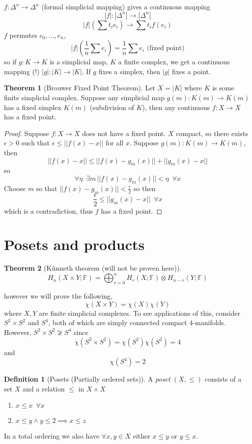 \documentclass[a4paper,14pt]{extarticle}
\theoremstyle{definition}
\newtheorem*{theorem}{Theorem}
\newtheorem*{definition}{Definition}
\begin{document}
$f:\Delta^n\rightarrow \Delta^n$ (formal simplicial mapping) gives a continuous mapping
\[|f|:|\Delta^n|\rightarrow |\Delta^n|\]
\[|f|(\sum t_i e_i)\rightarrow \sum t_i f(e_i)\] $f$ permutes $e_0, \ldots, e_n$,
\[|f|(\frac{1}{n}\sum e_i) = \frac{1}{n}\sum e_i\text{ (fixed point)}\]
so if $g:K\rightarrow K$ is a simplicial map, $K$ a finite complex, we get a continuous
mapping (!) $|g|:|K|\rightarrow |K|$. If $g$ fixes a simplex, then 
$|g|$ fixes a point.

\begin{theorem}[Brouwer Fixed Point Theorem]
	Let $X=|K|$ where $K$ is some finite simplicial complex. Suppose any simplicial map 
	$g(m):K(m)\rightarrow K(m)$ has a fixed simplex $K(m)$ (subdivision of $K$), then any 
	continuous $f:X\rightarrow X$ has a fixed point.
\end{theorem}

\begin{proof}
	Suppose $f:X\rightarrow X$ does not have a fixed point. $X$ compact, so there exists 
	$\epsilon>0$ such that $\epsilon\leq||f(x)-x||$ for all $x$. Suppose 
	$g(m):K(m)\rightarrow K(m)$, then 
	\[||f(x)-x||\leq||f(x)-g_m(x)||+||g_m(x)-x||\] so 
	\[\forall\eta\,\,\,\exists m \,||f(x)-g_m(x)||<\eta\,\,\,\forall x\]
	Choose $m$ so that $||f(x)-g_m(x)||<\frac{\epsilon}{2}$ so then 
	\[\frac{\epsilon}{2}\leq||g_m(x)-x||\,\,\,\forall x\] which is a contradiction, thus 
	$f$ has a fixed point.
\end{proof}

\section{Posets and products}
\begin{theorem}[Künneth theorem (will not be proven here)]
	\[H_n(X\times Y;\mathbb{F})=\bigoplus_{r=0}^n H_r(X;\mathbb{F})\otimes H_{n-r}(Y;\mathbb{F})\]
\end{theorem}

\noindent however we will prove the following, 
\[\chi(X\times Y)=\chi(X)\chi(Y)\]
where $X,Y$ are finite simplicial complexes. To see applications of this, consider 
$S^2\times S^2$ and $S^4$, both of which are simply connected compact 4-manifolds. 
However, $S^2\times S^2\not\cong S^4$ since \[\chi(S^2\times S^2)=\chi(S^2)\chi(S^2)=4\]
and \[\chi(S^4)=2\]

\begin{definition}[Posets (Partially ordered sets)]
	A \emph{poset} $(X,\leq)$ consists of a set $X$ and a relation $\leq$ in $X\times X$
	\begin{enumerate}
		\item $x\leq x \,\,\,\forall x$
		\item $x\leq y\wedge y\leq 2\implies x\leq z$
	\end{enumerate}
	In a total ordering we also have $\forall x,y\in X$ either $x\leq y$ or $y\leq x$.
\end{definition}
\end{document}
